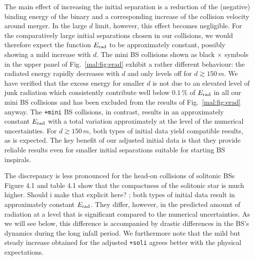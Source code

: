 The main effect of increasing the initial separation is a
reduction of the (negative) binding energy of the binary and a corresponding
increase of the collision velocity around merger. In the large
$d$ limit, however, this effect becomes negligible. For the
comparatively large initial separations chosen in our
collisions, we would therefore
expect the function $E_{\rm rad}$ to be approximately constant,
possibly showing a mild increase with $d$. The mini BS collisions
shown as black $\times$ symbols in the upper panel of
Fig.~\ref{mal:fig:erad} exhibit a rather different behaviour:
the radiated energy rapidly decreases with $d$ and only levels
off for $d\gtrsim 150\,m$. We have verified that the excess
energy for smaller $d$ is not due to an elevated level of
junk radiation which consistently contribute well below
$0.1\,\%$ of $E_{\rm rad}$ in all our mini BS collisions and has
been excluded from the results of Fig.~\ref{mal:fig:erad} anyway.
The {\tt +mini} BS collisions,
in contrast, results in an approximately constant $E_{\rm rad}$
with a total variation approximately at the level of the
numerical uncertainties. For $d\gtrsim 150\,m$, both types of
initial data yield compatible results, as is expected.
The key benefit of our adjusted initial data is that they provide
reliable results even for smaller initial separations suitable
for starting BS inspirals.

The discrepancy is less pronounced for the head-on collisions
of solitonic BSs \color{choral} Figure 4.1 and table 4.1 show that
the compactness of the solitonic star is much higher. Should i make that
explicit here? \color{black}; both types of initial data result
in approximately constant $E_{\rm rad}$. They differ, however,
in the predicted amount of radiation at a level that
is significant compared to
the numerical uncertainties. As we will see below, this difference
is accompanied by drastic differences in the BS's dynamics during the
long infall period. We furthermore note that the mild but
steady increase obtained for the adjusted {\tt +soli} agrees
better with the physical expectations.

